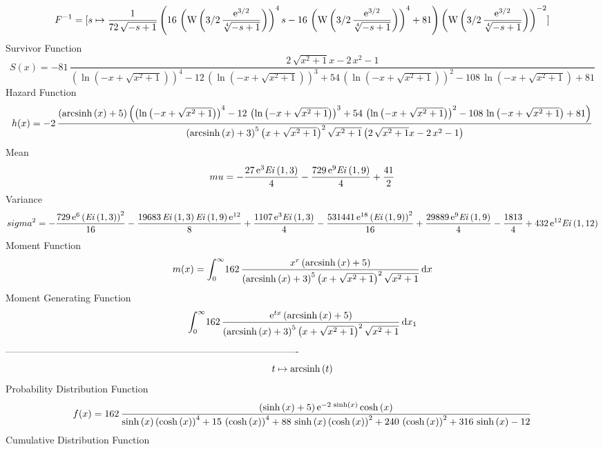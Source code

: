 \documentclass[12pt]{article}
\begin{document}
  $$F^{-1} =
[s\mapsto {\frac {1}{72\,\sqrt {-s+1}} \left( 16\, \left( {\rm W} 
\left(3/2\,{\frac {{{\rm e}^{3/2}}}{\sqrt [4]{-s+1}}}\right) \right) ^
{4}s-16\, \left( {\rm W} \left(3/2\,{\frac {{{\rm e}^{3/2}}}{\sqrt [4]
{-s+1}}}\right) \right) ^{4}+81 \right)  \left( {\rm W} \left(3/2\,{
\frac {{{\rm e}^{3/2}}}{\sqrt [4]{-s+1}}}\right) \right) ^{-2}}]
$$Survivor Function 
 $$ S(x)=-81\,{\frac {2\,\sqrt {{x}^{2}+1}x-2\,{x}^{2}-1}{ \left( \ln  \left( -
x+\sqrt {{x}^{2}+1} \right)  \right) ^{4}-12\, \left( \ln  \left( -x+
\sqrt {{x}^{2}+1} \right)  \right) ^{3}+54\, \left( \ln  \left( -x+
\sqrt {{x}^{2}+1} \right)  \right) ^{2}-108\,\ln  \left( -x+\sqrt {{x}
^{2}+1} \right) +81}}
$$ Hazard Function 
 $$ h(x)=-2\,{\frac { \left( {\rm arcsinh} \left(x\right)+5 \right)  \left( 
 \left( \ln  \left( -x+\sqrt {{x}^{2}+1} \right)  \right) ^{4}-12\,
 \left( \ln  \left( -x+\sqrt {{x}^{2}+1} \right)  \right) ^{3}+54\,
 \left( \ln  \left( -x+\sqrt {{x}^{2}+1} \right)  \right) ^{2}-108\,
\ln  \left( -x+\sqrt {{x}^{2}+1} \right) +81 \right) }{ \left( 
{\rm arcsinh} \left(x\right)+3 \right) ^{5} \left( x+\sqrt {{x}^{2}+1}
 \right) ^{2}\sqrt {{x}^{2}+1} \left( 2\,\sqrt {{x}^{2}+1}x-2\,{x}^{2}
-1 \right) }}
$$Mean 
 $$ mu=-{\frac {27\,{{\rm e}^{3}}{\it Ei} \left( 1,3 \right) }{4}}-{\frac {
729\,{{\rm e}^{9}}{\it Ei} \left( 1,9 \right) }{4}}+{\frac{41}{2}}
$$ Variance 
 $$ sigma^2 = -{\frac {729\,{{\rm e}^{6}} \left( {\it Ei} \left( 1,3 \right) 
 \right) ^{2}}{16}}-{\frac {19683\,{\it Ei} \left( 1,3 \right) {\it Ei
} \left( 1,9 \right) {{\rm e}^{12}}}{8}}+{\frac {1107\,{{\rm e}^{3}}{
\it Ei} \left( 1,3 \right) }{4}}-{\frac {531441\,{{\rm e}^{18}}
 \left( {\it Ei} \left( 1,9 \right)  \right) ^{2}}{16}}+{\frac {29889
\,{{\rm e}^{9}}{\it Ei} \left( 1,9 \right) }{4}}-{\frac{1813}{4}}+432
\,{{\rm e}^{12}}{\it Ei} \left( 1,12 \right) 
$$Moment Function 
 $$ m(x) = \int_{0}^{\infty }\!162\,{\frac {{x}^{r} \left( {\rm arcsinh} \left(x
\right)+5 \right) }{ \left( {\rm arcsinh} \left(x\right)+3 \right) ^{5
} \left( x+\sqrt {{x}^{2}+1} \right) ^{2}\sqrt {{x}^{2}+1}}}\,{\rm d}x
$$ Moment Generating Function 
 $$\int_{0}^{\infty }\!162\,{\frac {{{\rm e}^{tx}} \left( {\rm arcsinh} 
\left(x\right)+5 \right) }{ \left( {\rm arcsinh} \left(x\right)+3
 \right) ^{5} \left( x+\sqrt {{x}^{2}+1} \right) ^{2}\sqrt {{x}^{2}+1}
}}\,{\rm d}x_{{1}}
$$-------------------------------------------------------------------------------------------  \\$$t\mapsto {\rm arcsinh} \left(t\right)
$$Probability Distribution Function 
$$  f(x)=162\,{\frac { \left( \sinh \left( x \right) +5 \right) {{\rm e}^{-2\,
\sinh \left( x \right) }}\cosh \left( x \right) }{\sinh \left( x
 \right)  \left( \cosh \left( x \right)  \right) ^{4}+15\, \left( 
\cosh \left( x \right)  \right) ^{4}+88\,\sinh \left( x \right) 
 \left( \cosh \left( x \right)  \right) ^{2}+240\, \left( \cosh
 \left( x \right)  \right) ^{2}+316\,\sinh \left( x \right) -12}}
$$Cumulative Distribution Function  
\end{document}
